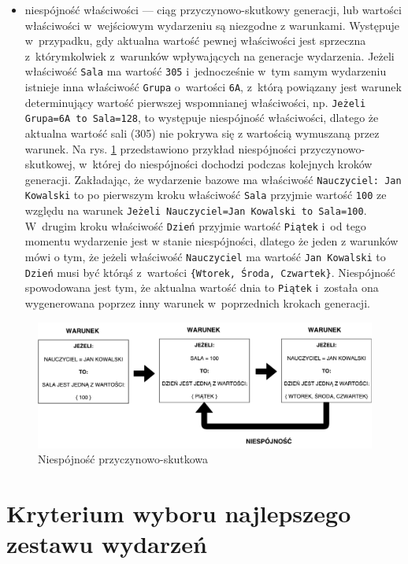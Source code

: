 \documentclass[a4paper]{book}
\begin{document}
\begin{itemize}
\item niespójność właściwości --- ciąg przyczynowo-skutkowy generacji, lub wartości właściwości w~wejściowym wydarzeniu są niezgodne z warunkami. Występuje w~przypadku, gdy aktualna wartość pewnej właściwości jest sprzeczna z~którymkolwiek z~warunków wpływających na generacje wydarzenia. Jeżeli właściwość \lstinline|Sala| ma wartość \lstinline|305| i~jednocześnie w~tym samym wydarzeniu istnieje inna właściwość \lstinline|Grupa| o~wartości \lstinline|6A|, z~którą powiązany jest warunek determinujący wartość pierwszej wspomnianej właściwości, np. \lstinline|Jeżeli Grupa=6A to Sala=128|, to występuje niespójność właściwości, dlatego że aktualna wartość sali (305) nie pokrywa się z wartością wymuszaną przez warunek. Na rys. \ref{id:fig:Niespojnosc} przedstawiono przykład niespójności przyczynowo-skutkowej, w~której do niespójności dochodzi podczas kolejnych kroków generacji. Zakładając, że wydarzenie bazowe ma właściwość \lstinline|Nauczyciel: Jan Kowalski| to po pierwszym kroku właściwość \lstinline|Sala| przyjmie wartość \lstinline|100| ze względu na warunek \lstinline|Jeżeli Nauczyciel=Jan Kowalski to Sala=100|. W~drugim kroku właściwość \lstinline|Dzień| przyjmie wartość \lstinline|Piątek| i~od tego momentu wydarzenie jest w stanie niespójności, dlatego że jeden z warunków mówi o tym, że jeżeli właściwość \lstinline|Nauczyciel| ma wartość \lstinline|Jan Kowalski| to \lstinline|Dzień| musi być którąś z~wartości \lstinline|{Wtorek, Środa, Czwartek}|. Niespójność spowodowana jest tym, że aktualna wartość dnia to \lstinline|Piątek| i~została ona wygenerowana poprzez inny warunek w~poprzednich krokach generacji.
\end{itemize}
\begin{figure}
	\centering
	\includegraphics[width=1.0\textwidth]{./img/Niespojnosc.pdf}
	\caption{Niespójność przyczynowo-skutkowa}
	\label{id:fig:Niespojnosc}
\end{figure}

\section{Kryterium wyboru najlepszego zestawu wydarzeń}
\label{wspolczynnikAlg}
\end{document}
